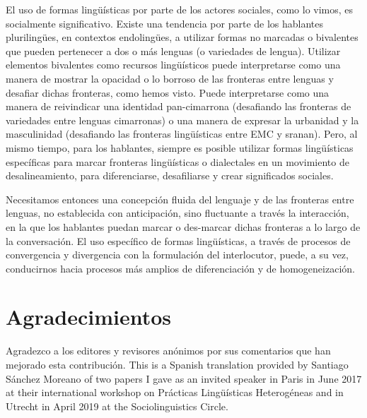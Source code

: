 \documentclass[output=paper]{langscibook}
\begin{document}
El uso de formas lingüísticas por parte de los actores sociales, como lo vimos, es socialmente significativo. Existe una tendencia por parte de los hablantes plurilingües, en contextos endolingües, a utilizar formas no marcadas o bivalentes que pueden pertenecer a dos o más lenguas (o variedades de lengua).  Utilizar elementos bivalentes como recursos lingüísticos puede interpretarse como una manera de mostrar la opacidad o lo borroso de las fronteras entre lenguas y desafiar dichas fronteras, como hemos visto. Puede interpretarse como una manera de reivindicar una identidad pan-cimarrona (desafiando las fronteras de variedades entre lenguas cimarronas) o una manera de expresar la urbanidad y la masculinidad (desafiando las fronteras lingüísticas entre EMC y sranan). Pero, al mismo tiempo, para los hablantes, siempre es posible utilizar formas lingüísticas específicas para marcar fronteras lingüísticas o dialectales en un movimiento de desalineamiento, para diferenciarse, desafiliarse y crear significados sociales.

Necesitamos entonces una concepción fluida del lenguaje y de las fronteras entre lenguas, no establecida con anticipación, sino fluctuante a través la interacción, en la que los hablantes puedan marcar o des-marcar dichas fronteras a lo largo de la conversación. El uso específico de formas lingüísticas, a través de procesos de convergencia y divergencia con la formulación del interlocutor, puede, a su vez, conducirnos hacia procesos más amplios de diferenciación y de homogeneización.

\section*{Agradecimientos}
Agradezco a los editores y revisores anónimos por sus comentarios que han mejorado esta contribución. 
This is a Spanish translation provided by Santiago Sánchez Moreano of two papers I gave as an invited speaker in Paris in June 2017 at their international workshop on Prácticas Lingüísticas Heterogéneas and in Utrecht in April 2019 at the Sociolinguistics Circle.

\sloppy\printbibliography[heading=subbibliography,notkeyword=this]
\end{document}
